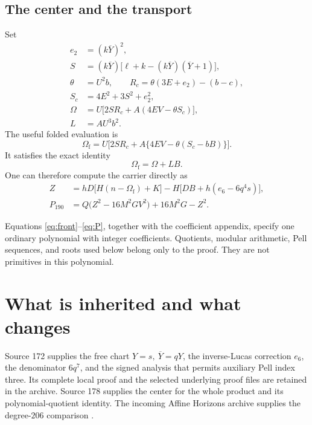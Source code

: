 \documentclass[11pt]{article}
\theoremstyle{remark}
\newcommand{\yb}{\overline Y}
\begin{document}
\subsection{The center and the transport}
Set
\begin{align}
 e_2&=(k\yb)^2,\nonumber\\
 S&=(k\yb)\bigl[\ell+k-(k\yb)(\yb+1)\bigr],\nonumber\\
 \theta&=U^2b,\qquad
 R_c=\theta(3E+e_2)-(b-c),\nonumber\\
 S_c&=4E^2+3S^2+e_2^2,\label{eq:center}\\
 \Omega&=U\bigl[2SR_c+A(4EV-\theta S_c)\bigr],\nonumber\\
 L&=AU^3b^2.\nonumber
\end{align}
The useful folded evaluation is
\[
 \Omega_{\mathrm f}
   =U\bigl[2SR_c+A\{4EV-\theta(S_c-bB)\}\bigr].
 \tag{F}
\]
It satisfies the exact identity
\[
 \Omega_{\mathrm f}=\Omega+LB.
 \tag{F1}
\]
One can therefore compute the carrier directly as
\begin{align}
 Z&=hD\bigl[H(n-\Omega_{\mathrm f})+K\bigr]
      -H\bigl[DB+h(e_6-6q^4s)\bigr],             \label{eq:Z}\\
 P_{190}&=Q\bigl(Z^2-16M^2GV^2\bigr)+16M^2G-Z^2.
                                                        \label{eq:P}
\end{align}
\begin{center}
\end{center}
Equations \eqref{eq:front}--\eqref{eq:P}, together with the coefficient
appendix, specify one ordinary polynomial with integer coefficients.
Quotients, modular arithmetic, Pell sequences, and roots used below belong
only to the proof. They are not primitives in this polynomial.

\section{What is inherited and what changes}\label{sec:boundary}

Source 172 supplies the free chart \(Y=s,\ \yb=qY\), the inverse-Lucas
correction \(e_6\), the denominator \(6q^7\), and the signed analysis that
permits auxiliary Pell index three. Its complete local proof and the
selected underlying proof files are retained in the archive.
Source 178 supplies the center for the whole product and its
polynomial-quotient identity. The incoming Affine Horizons archive supplies
the degree-\(206\) comparison \cite{source172,source178,incomingAffine}.
\end{document}

